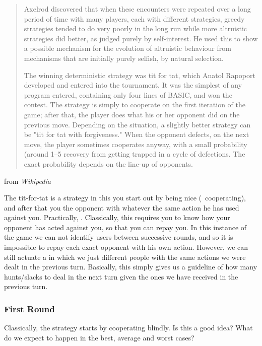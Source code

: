 \documentclass[10pt,fleqn]{article}
\begin{document}
\begin{quotation}
Axelrod discovered that when these encounters were repeated over a long period
of time with many players, each with different strategies, greedy strategies
tended to do very poorly in the long run while more altruistic strategies did
better, as judged purely by self-interest. He used this to show a possible
mechanism for the evolution of altruistic behaviour from mechanisms that are
initially purely selfish, by natural selection.

The winning deterministic strategy was tit for tat, which Anatol Rapoport
developed and entered into the tournament. It was the simplest of any program
entered, containing only four lines of BASIC, and won the contest. The strategy
is simply to cooperate on the first iteration of the game; after that, the
player does what his or her opponent did on the previous move. Depending on the
situation, a slightly better strategy can be "tit for tat with forgiveness."
When the opponent defects, on the next move, the player sometimes cooperates
anyway, with a small probability (around 1–5%
recovery from getting trapped in a cycle of defections. The exact probability
depends on the line-up of opponents.
\end{quotation}
\hfill from \emph{Wikipedia}

The tit-for-tat is a strategy in this you start out by being nice (\ie\
cooperating), and after that you  the opponent with whatever the same
action he has used against you. Practically, \s{an eye for an eye}. Classically,
this requires you to know how your opponent has acted against you, so that you
can repay you. In this instance of the game we can not identify users between
successive rounds, and so it is impossible to repay each exact opponent with his
own action. However, we can still actuate a \s{tit for tat} in which we just
\s{repay} different people with the same actions we were dealt in the previous
turn. Basically, this simply gives us a guideline of how many hunts/slacks to
deal in the next turn given the ones we have received in the previous turn.

\subsubsection{First Round}
Classically, the  strategy starts by cooperating blindly. Is this
a good idea? What do we expect to happen in the best, average and worst cases?
\end{document}
